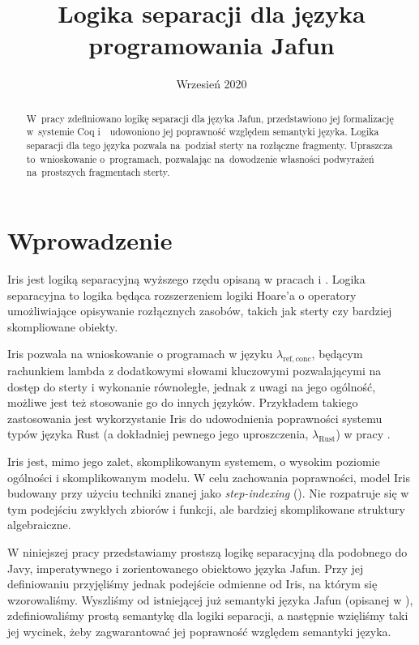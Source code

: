 \documentclass[]{pracamgr}
\title{Logika separacji dla języka programowania Jafun}
\date{Wrzesień 2020}
\renewcommand \| {\hspace{0.75em} | \hspace{0.75em} }
\renewcommand \[ {[\![}
\renewcommand \] {]\!]}
\theoremstyle{definition}
\begin{document}
\maketitle

\begin{abstract}
  W~pracy zdefiniowano logikę separacji dla języka Jafun, przedstawiono jej formalizację
  w~systemie Coq i~~udowoniono jej poprawność względem semantyki języka. Logika separacji
  dla tego języka pozwala
  na~podział sterty na rozłączne fragmenty. Upraszcza to~wnioskowanie o~programach, pozwalając
  na~dowodzenie własności podwyrażeń na~prostszych fragmentach sterty.
\end{abstract}

\tableofcontents

\chapter*{Wprowadzenie}
Iris jest logiką separacyjną wyższego rzędu opisaną w pracach \cite{iris-notes} i \cite{iris-model}.
Logika separacyjna to logika będąca rozszerzeniem logiki Hoare'a o operatory umożliwiające
opisywanie rozłącznych zasobów, takich jak sterty czy bardziej skompliowane obiekty.

Iris pozwala na wnioskowanie o programach w języku $\lambda_{\mathrm{ref, conc}}$,
będącym rachunkiem lambda
z dodatkowymi słowami kluczowymi pozwalającymi na dostęp do sterty i wykonanie równoległe,
jednak z uwagi na jego ogólność, możliwe jest też stosowanie go do innych języków.
Przykładem takiego zastosowania jest wykorzystanie Iris do udowodnienia poprawności systemu
typów języka Rust (a dokładniej pewnego jego uproszczenia, $\lambda_{\mathrm{Rust}}$)
w pracy \cite{iris-rust}.

Iris jest, mimo jego zalet, skomplikowanym systemem, o wysokim poziomie ogólności i 
skomplikowanym modelu.
W celu zachowania poprawności, model Iris budowany przy użyciu techniki znanej
jako \textit{step-indexing} (\cite{step-indexing}).
Nie rozpatruje się w tym podejściu zwykłych zbiorów i funkcji, ale bardziej skomplikowane
struktury algebraiczne.

W niniejszej pracy przedstawiamy prostszą logikę separacyjną dla
podobnego do Javy, imperatywnego i zorientowanego obiektowo języka Jafun.
Przy jej definiowaniu przyjęliśmy jednak podejście odmienne od Iris, na którym się wzorowaliśmy.
Wyszliśmy od istniejącej już semantyki języka Jafun (opisanej w \cite{jafun-sem}),
zdefiniowaliśmy prostą semantykę dla logiki separacji, a następnie wzięliśmy taki jej wycinek,
żeby zagwarantować jej poprawność względem semantyki języka.
\end{document}
